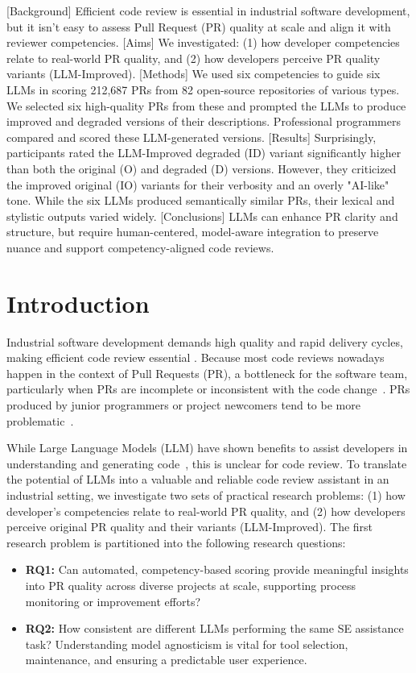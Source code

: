 \documentclass[conference]{IEEEtran}
\begin{document}
[Background] Efficient code review is essential in industrial software development, but it isn't easy to assess Pull Request (PR) quality at scale and align it with reviewer competencies. [Aims] We investigated: (1) how developer competencies relate to real-world PR quality, and (2) how developers perceive PR quality variants (LLM-Improved). [Methods] We used six competencies to guide six LLMs in scoring 212,687 PRs from 82 open-source repositories of various types. We selected six high-quality PRs from these and prompted the LLMs to produce improved and degraded versions of their descriptions. Professional programmers compared and scored these LLM-generated versions. [Results] Surprisingly, participants rated the LLM-Improved degraded (ID) variant significantly higher than both the original (O) and degraded (D) versions. However, they criticized the improved original (IO) variants for their verbosity and an overly "AI-like" tone. While the six LLMs produced semantically similar PRs, their lexical and stylistic outputs varied widely.  [Conclusions] LLMs can enhance PR clarity and structure, but require human-centered, model-aware integration to preserve nuance and support competency-aligned code reviews.

\section{Introduction} 
Industrial software development demands high quality and rapid delivery cycles, making efficient code review essential \cite{mcintosh2014impact}. Because most code reviews nowadays happen in the context of Pull Requests (PR), a bottleneck for the software team, particularly when PRs are incomplete or inconsistent with the code change~\cite{bacchelli2013expectations}. PRs produced by junior programmers or project newcomers tend to be more problematic~\cite{khatoonabadi2023wasted,kovalenko2018code
}.

While Large Language Models (LLM) have shown benefits to assist developers in understanding and generating code~\cite{fan2023large,cui2025effects}, this is unclear for code review. To translate the potential of LLMs into a valuable and reliable code review assistant in an industrial setting, we investigate two sets of practical research problems: (1) how developer's competencies relate to real-world PR quality, and (2) how developers perceive original PR quality and their variants (LLM-Improved). The first research problem is partitioned into the following research questions:
\begin{itemize}
    \item \textbf{RQ1:} Can automated, competency-based scoring provide meaningful insights into PR quality across diverse projects at scale, supporting process monitoring or improvement efforts?
    \item \textbf{RQ2:} How consistent are different LLMs performing the same SE assistance task? Understanding model agnosticism is vital for tool selection, maintenance, and ensuring a predictable user experience.
\end{itemize}
\end{document}
